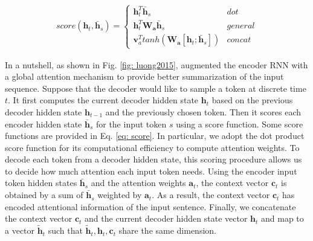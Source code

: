 \small
\begin{align}
    score(\bm{h}_t, \bm{\bar h}_s) =
  \begin{cases}
        \bm{h}_t^T \bm{\bar h}_s & dot \\
        \bm{h}_t^T \bm{W_a} \bm{\bar h}_s & general \\
        \bm{v}_a^T tanh(\bm{W_a} [\bm{h}_t;\bm{\bar h}_s]) & concat 
  \end{cases}
  \label{eq: score}
\end{align}
\normalsize

In a nutshell, as shown in Fig. \ref{fig: luong2015}, \cite{luong2015effective} augmented the encoder RNN with a global attention mechanism to provide better summarization of the input sequence. Suppose that the decoder would like to sample a token at discrete time $t$. It first computes the current decoder hidden state $\bm{h}_t$ based on the previous decoder hidden state $\bm{h}_{t-1}$ and the previously chosen token. Then it scores each encoder hidden state $\bm{\bar h}_s$ for the input token $s$ using a score function. Some score functions are provided in Eq. \ref{eq: score}. In particular, we adopt the dot product score function for its computational efficiency to compute attention weights. To decode each token from a decoder hidden state, this scoring procedure allows us to decide how much attention each input token needs. Using the encoder input token hidden states $\bm{\bar h}_s$ and the attention weights $\bm{a}_t$, the context vector $\bm{c}_t$ is obtained by a sum of $\bm{\bar h}_s$ weighted by $\bm{a}_t$. As a result, the context vector $\bm{c}_t$ has encoded attentional information of the input sentence. Finally, we concatenate the context vector $\bm{c}_t$ and the current decoder hidden state vector $\bm{h}_t$ and map to a vector $\bm{\tilde h}_t$ such that $\bm{\tilde h}_t, \bm{h}_t, \bm{c}_t$ share the same dimension.


